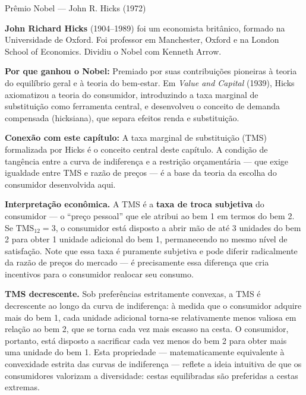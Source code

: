 \documentclass[11pt,twoside,openright]{book}
\begin{document}
\begin{infobox}{Prêmio Nobel — John R. Hicks (1972)}

\textbf{John Richard Hicks} (1904--1989) foi um economista britânico,
formado na Universidade de Oxford. Foi professor em Manchester, Oxford e
na London School of Economics. Dividiu o Nobel com Kenneth Arrow.

\textbf{Por que ganhou o Nobel:} Premiado por suas contribuições
pioneiras à teoria do equilíbrio geral e à teoria do bem-estar. Em
\emph{Value and Capital} (1939), Hicks axiomatizou a teoria do
consumidor, introduzindo a taxa marginal de substituição como ferramenta
central, e desenvolveu o conceito de demanda compensada (hicksiana), que
separa efeitos renda e substituição.

\textbf{Conexão com este capítulo:} A taxa marginal de substituição
(TMS) formalizada por Hicks é o conceito central deste capítulo. A
condição de tangência entre a curva de indiferença e a restrição
orçamentária --- que exige igualdade entre TMS e razão de preços --- é a
base da teoria da escolha do consumidor desenvolvida aqui.

\end{infobox}

\textbf{Interpretação econômica.} A TMS é a \textbf{taxa de troca
subjetiva} do consumidor --- o ``preço pessoal'' que ele atribui ao bem
1 em termos do bem 2. Se \(\text{TMS}_{12} = 3\), o consumidor está
disposto a abrir mão de até 3 unidades do bem 2 para obter 1 unidade
adicional do bem 1, permanecendo no mesmo nível de satisfação. Note que
essa taxa é puramente subjetiva e pode diferir radicalmente da razão de
preços do mercado --- é precisamente essa diferença que cria incentivos
para o consumidor realocar seu consumo.

\textbf{TMS decrescente.} Sob preferências estritamente convexas, a TMS
é decrescente ao longo da curva de indiferença: à medida que o
consumidor adquire mais do bem 1, cada unidade adicional torna-se
relativamente menos valiosa em relação ao bem 2, que se torna cada vez
mais escasso na cesta. O consumidor, portanto, está disposto a
sacrificar cada vez menos do bem 2 para obter mais uma unidade do bem 1.
Esta propriedade --- matematicamente equivalente à convexidade estrita
das curvas de indiferença --- reflete a ideia intuitiva de que os
consumidores valorizam a diversidade: cestas equilibradas são preferidas
a cestas extremas.
\end{document}
